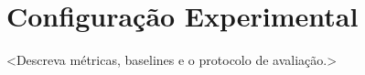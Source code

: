 \section{Configura\c{c}\~ao Experimental}
\label{sec:setup}


<Descreva m\'etricas, baselines e o protocolo de avalia\c{c}\~ao.>
